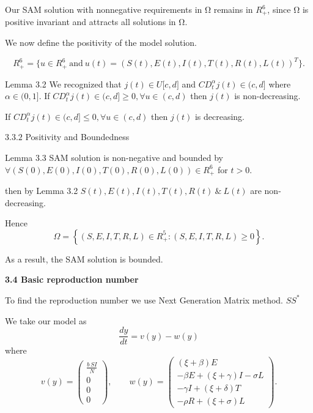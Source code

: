 \documentclass[10pt]{NSP1}
\begin{document}
	Our SAM solution with nonnegative requirements in Ω remains in \(R_{+}^{6}\), since Ω is positive invariant and attracts all solutions in Ω.
	
	We now define the positivity of the model solution.
	
	\[
	R_{+}^{6} = \{ u\in R_{+}^{6}\ \text{and}\ u(t) = (S(t),E(t),I(t),T(t),R(t),L(t))^{T} \}. \tag{3.5}
	\]
	
	Lemma 3.2 We recognized that \(j(t)\in U\lbrack c,d\rbrack\) and \(CD_{t}^{\alpha} j(t)\in (c,d\rbrack\) where \(\alpha \in (0,1\rbrack\). If \(CD_{t}^{\alpha} j(t)\in (c,d\rbrack \geq 0,\forall u \in (c,d)\) then \(j(t)\) is non-decreasing.
	
	If \(CD_{t}^{\alpha} j(t)\in (c,d\rbrack \leq 0,\forall u \in (c,d)\) then \(j(t)\) is decreasing.
	
	3\(.3.2\) Positivity and Boundedness
	
	Lemma 3.3 SAM solution is non-negative and bounded by \(\forall(S(0),E(0),I(0),T(0),R(0),L(0))\in R_{+}^{6}\) for \(t>0\).
	
	\par\vspace{14.0pt}\vspace{14.0pt}
	
	then by Lemma 3.2 \(S(t),E(t),I(t),T(t),R(t)\ \&\ L(t)\) are non-decreasing.
	
	Hence
	\[
	\Omega = \left\{ (S,E,I,T,R,L)\in R_{+}^{5}: (S,E,I,T,R,L) \geq 0 \right\}. \tag{3.7}
	\]
	
	As a result, the SAM solution is bounded.
	
	\par\vspace{14.0pt}\noindent \begin{center}\large\bfseries 3.4 Basic reproduction number\end{center}\vspace{14.0pt}
	
	To find the reproduction number we use Next Generation Matrix method. \(SS^{*}\)
	
	We take our model as
	\[
	\frac{dy}{dt} = v(y) - w(y) \tag{3.9}
	\]
	where
	\[
	v(y) = \begin{pmatrix}
		\frac{b\,S I}{N} \\ 0 \\ 0 \\ 0
	\end{pmatrix},\qquad
	w(y) = \begin{pmatrix}
		(\xi + \beta)E \\
		-\beta E + (\xi + \gamma)I - \sigma L \\
		-\gamma I + (\xi + \delta)T \\
		-\rho R + (\xi + \sigma)L
	\end{pmatrix}. \tag{3.10}
	\]
	
\end{document}
